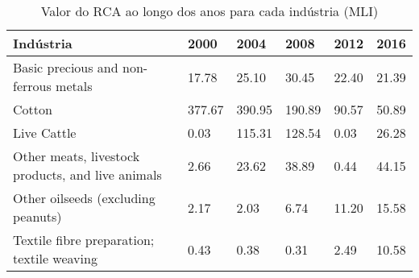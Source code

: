 \begin{table}
\centering
\caption{Valor do RCA ao longo dos anos para cada indústria (MLI)}
\label{tab:ex3-tempo-MLI}
\begin{tabular}{p{6cm}p{1.5cm}p{1.5cm}p{1.5cm}p{1.5cm}p{1.5cm}}
\toprule
                                        Indústria &   2000 &   2004 &   2008 &  2012 &  2016 \\
\midrule
            Basic precious and non-ferrous metals &  17.78 &  25.10 &  30.45 & 22.40 & 21.39 \\
                                           Cotton & 377.67 & 390.95 & 190.89 & 90.57 & 50.89 \\
                                      Live Cattle &   0.03 & 115.31 & 128.54 &  0.03 & 26.28 \\
Other meats, livestock products, and live animals &   2.66 &  23.62 &  38.89 &  0.44 & 44.15 \\
               Other oilseeds (excluding peanuts) &   2.17 &   2.03 &   6.74 & 11.20 & 15.58 \\
       Textile fibre preparation; textile weaving &   0.43 &   0.38 &   0.31 &  2.49 & 10.58 \\
\bottomrule
\end{tabular}
\end{table}
